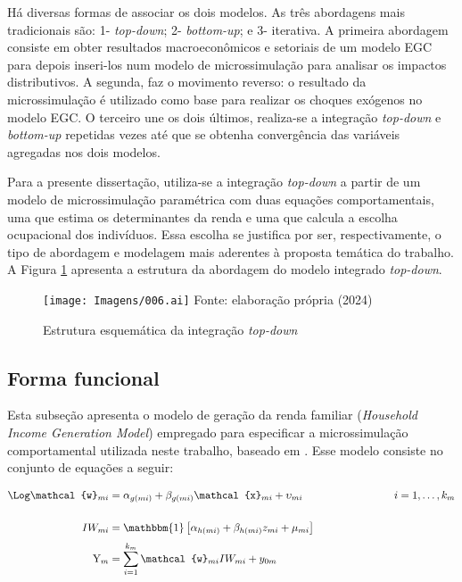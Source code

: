 Há diversas formas de associar os dois modelos. As três abordagens mais tradicionais são: 1- \textit{top-down}; 2- \textit{bottom-up}; e 3- iterativa. A primeira abordagem consiste em obter resultados macroeconômicos e setoriais de um modelo EGC para depois inseri-los num modelo de microssimulação para analisar os impactos distributivos. A segunda, faz o movimento reverso: o resultado da microssimulação é utilizado como base para realizar os choques exógenos no modelo EGC. O terceiro une os dois últimos, realiza-se a integração \textit{top-down} e \textit{bottom-up} repetidas vezes até que se obtenha convergência das variáveis agregadas nos dois modelos.

Para a presente dissertação, utiliza-se a integração \textit{top-down} a partir de um modelo de microssimulação paramétrica com duas equações comportamentais, uma que estima os determinantes da renda e uma que calcula a escolha ocupacional dos indivíduos. Essa escolha se justifica por ser, respectivamente, o tipo de abordagem e modelagem mais aderentes à proposta temática do trabalho. A Figura \ref{fig:microssimulacao} apresenta a estrutura da abordagem do modelo integrado \textit{top-down}.

\begin{landscape}
	\begin{figure}
		\centering
		\caption{Estrutura esquemática da integração \textit{top-down}} \label{fig:microssimulacao}
		\texttt{[image: Imagens/006.ai]}
		\footnotesize
		Fonte: elaboração própria (2024)
	\end{figure}
\end{landscape}


\subsection{Forma funcional} \label{subsec:forma_funcional}

Esta subseção apresenta o modelo de geração da renda familiar (\textit{Household Income Generation Model}) empregado para especificar a microssimulação comportamental utilizada neste trabalho, baseado em \textcite{bourguignon05}. Esse modelo consiste no conjunto de equações a seguir:

\begin{align}
	\Log \mathcal{w}_{mi}  &= \alpha_{g(mi)} + \beta_{g(mi)} \mathcal{x}_{mi} + \upsilon_{mi} \hspace{3cm} i = 1, \ldots, k_m \label{eq:renda} \\[0.5cm]
	IW_{mi}                &= \mathbbm{1} \left[\alpha_{h(mi)} + \beta_{h(mi)} z_{mi} + \mu_{mi} \right] \label{eq:ocm} \\[0.1cm]
	\text{Y}_{m}           &= \sum_{i = 1}^{k_{m}} \mathcal{w}_{mi} IW_{mi} + y_{0m} \label{eq:renda_media}
\end{align}

